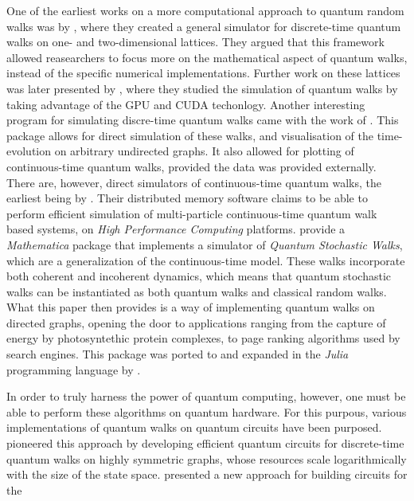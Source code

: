 \documentclass[../../dissertation.tex]{subfiles}
\begin{document}
One of the earliest works on a more computational approach to quantum random
walks was by \cite{marquezino2008}, where they created a general simulator for
discrete-time quantum walks on one- and two-dimensional lattices. They argued
that this framework allowed reasearchers to focus more on the mathematical
aspect of quantum walks, instead of the specific numerical implementations.
Further work on these lattices was later presented by \cite{sawerwain2010},
where they studied the simulation of quantum walks by taking advantage of the
GPU and CUDA techonlogy. Another interesting program for simulating discre-time
quantum walks came with the work of \cite{berry2011}. This package allows for
direct simulation of these walks, and visualisation of the time-evolution on
arbitrary undirected graphs. It also allowed for plotting of continuous-time
quantum walks, provided the data was provided externally. 
There are, however, direct simulators of continuous-time quantum walks, the
earliest being by \cite{izaac2015}. Their distributed memory software claims to
be able to perform efficient simulation of multi-particle continuous-time
quantum walk based systems, on \textit{High Performance Computing} platforms.
\cite{falloon2017a} provide a \textit{Mathematica} package that implements a
simulator of \textit{Quantum Stochastic Walks}, which are a generalization of
the continuous-time model. These walks incorporate both coherent and incoherent
dynamics, which means that quantum stochastic walks can be instantiated as both
quantum walks and classical random walks. What this paper then provides is a
way of implementing quantum walks on directed graphs, opening the door to
applications ranging from the capture of energy by photosyntethic protein
complexes, to page ranking algorithms used by search engines. This package was
ported to and expanded in the \textit{Julia} programming language by
\cite{glos2018}.\par
In order to truly harness the power of quantum computing, however, one must be
able to perform these algorithms on quantum hardware. For this purpous, various
implementations of quantum walks on quantum circuits have been purposed.
\cite{douglaswang07} pioneered this approach by developing
efficient quantum circuits for discrete-time quantum walks on highly symmetric
graphs, whose resources scale logarithmically with the size of the state space.
\cite{shakeel2020} presented a new approach for building circuits for the
\end{document}
